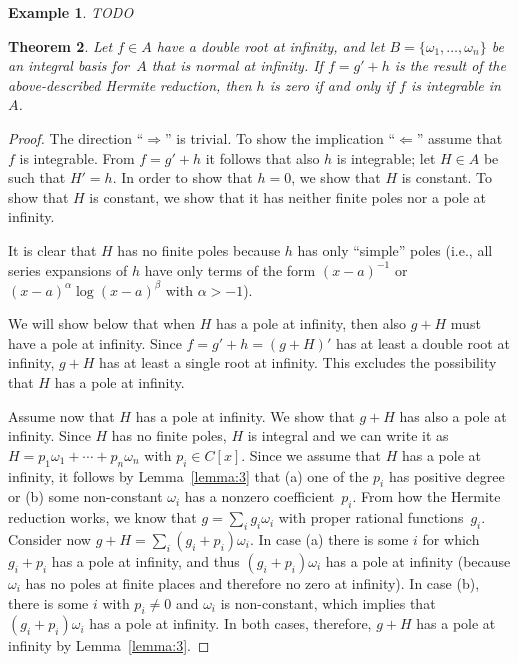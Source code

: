 \documentclass{sig-alternate}
\newtheorem{theorem}{Theorem}
\newtheorem{example}[theorem]{Example}
\begin{document}
\begin{example}
TODO
\end{example}

\begin{theorem}\label{thm:intiff0}
Let $f\in A$ have a double root at
infinity, and let $B=\{\omega_1,\ldots,\omega_n\}$ be an integral basis for~$A$
that is normal at infinity.
If $f=g'+h$ is the result of the above-described Hermite reduction,
then $h$ is zero if and only if $f$ is integrable in~$A$.
\end{theorem}
\begin{proof}
The direction ``$\Rightarrow$'' is trivial. To show the implication
``$\Leftarrow$'' assume that $f$ is integrable. From $f=g'+h$ it follows that
also $h$ is integrable; let $H\in A$ be such that $H'=h$.  In order to show
that $h=0$, we show that $H$ is constant.  To show that $H$ is constant, we
show that it has neither finite poles nor a pole at infinity.

It is clear that $H$ has no finite poles because $h$ has only ``simple'' poles
(i.e., all series expansions of $h$ have only terms of the form
$(x-a)^{-1}$ or $(x-a)^\alpha\log(x-a)^\beta$ with $\alpha>-1$).

We will show below that when $H$ has a pole at infinity, then also $g+H$ must
have a pole at infinity.  Since $f=g'+h=(g+H)'$ has at least a double root at
infinity, $g+H$ has at least a single root at infinity. This excludes the
possibility that $H$ has a pole at infinity.

Assume now that $H$ has a pole at infinity. We show that $g+H$ has also a pole at infinity.
Since $H$ has no finite poles, $H$ is integral and we can write it as
$H=p_1\omega_1+\cdots+p_n\omega_n$ with $p_i\in C[x]$.
Since we assume that $H$ has a pole at infinity, it follows by Lemma~\ref{lemma:3} that
(a) one of the $p_i$ has positive degree or
(b) some non-constant $\omega_i$ has a nonzero coefficient~$p_i$.
From how the Hermite reduction works, we know that $g=\sum_i g_i\omega_i$
with proper rational functions~$g_i$. Consider now $g+H=\sum_i (g_i+p_i)\omega_i$.
In case (a) there is some $i$ for which $g_i+p_i$ has a pole at infinity,
and thus $(g_i+p_i)\omega_i$ has a pole at infinity (because $\omega_i$ has
no poles at finite places and therefore no zero at infinity).
In case (b), there is some $i$ with $p_i\neq0$ and $\omega_i$ is non-constant,
which implies that $(g_i+p_i)\omega_i$ has a pole at infinity.
In both cases, therefore, $g+H$ has a pole at infinity by Lemma~\ref{lemma:3}.
\end{proof}
\end{document}
